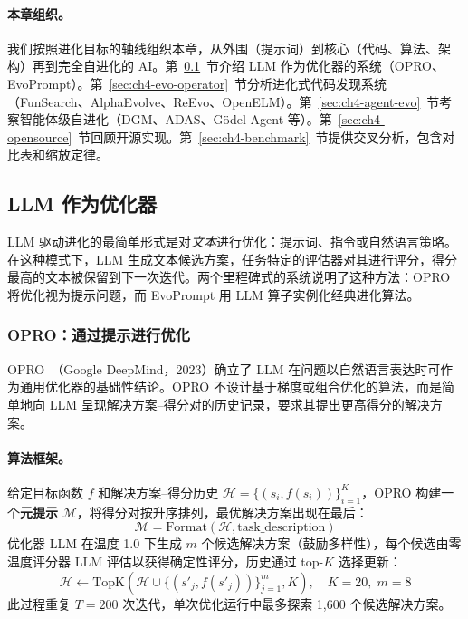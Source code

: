 \paragraph{本章组织。}
我们按照进化目标的轴线组织本章，从外围（提示词）到核心（代码、算法、架构）再到完全自进化的 AI。第~\ref{sec:ch4-llm-optimizer}~节介绍 LLM 作为优化器的系统（OPRO、EvoPrompt）。第~\ref{sec:ch4-evo-operator}~节分析进化式代码发现系统（FunSearch、AlphaEvolve、ReEvo、OpenELM）。第~\ref{sec:ch4-agent-evo}~节考察智能体级自进化（DGM、ADAS、G\"{o}del Agent 等）。第~\ref{sec:ch4-opensource}~节回顾开源实现。第~\ref{sec:ch4-benchmark}~节提供交叉分析，包含对比表和缩放定律。


\subsection{LLM 作为优化器}
\label{sec:ch4-llm-optimizer}

LLM 驱动进化的最简单形式是对\emph{文本}进行优化：提示词、指令或自然语言策略。在这种模式下，LLM 生成文本候选方案，任务特定的评估器对其进行评分，得分最高的文本被保留到下一次迭代。两个里程碑式的系统说明了这种方法：OPRO 将优化视为提示问题，而 EvoPrompt 用 LLM 算子实例化经典进化算法。

\subsubsection{OPRO：通过提示进行优化}

OPRO~\citep{opro2023}（Google DeepMind，2023）确立了 LLM 在问题以自然语言表达时可作为通用优化器的基础性结论。OPRO 不设计基于梯度或组合优化的算法，而是简单地向 LLM 呈现解决方案--得分对的历史记录，要求其提出更高得分的解决方案。

\paragraph{算法框架。}
给定目标函数 $f$ 和解决方案--得分历史 $\mathcal{H}=\{(s_i, f(s_i))\}_{i=1}^{K}$，OPRO 构建一个\textbf{元提示} $\mathcal{M}$，将得分对按升序排列，最优解决方案出现在最后：
\begin{equation}
\mathcal{M} = \text{Format}\left(\mathcal{H}, \text{task\_description}\right)
\end{equation}
优化器 LLM 在温度 1.0 下生成 $m$ 个候选解决方案（鼓励多样性），每个候选由零温度评分器 LLM 评估以获得确定性评分，历史通过 top-$K$ 选择更新：
\begin{equation}
\mathcal{H} \leftarrow \text{TopK}\left(\mathcal{H} \cup \{(s'_j, f(s'_j))\}_{j=1}^{m}, K\right), \quad K=20, \; m=8
\end{equation}
此过程重复 $T=200$ 次迭代，单次优化运行中最多探索 1,600 个候选解决方案。

